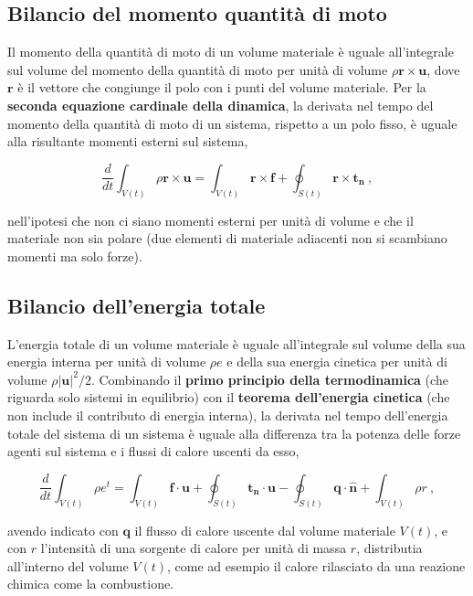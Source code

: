 \subsection{Bilancio del momento quantità di moto}

Il momento della quantità di moto di un volume materiale è uguale all'integrale sul volume del momento della quantità di moto per unità di volume $\rho \bm{r} \times \bm{u}$, dove $\bm{r}$ è il vettore che congiunge il polo con i punti del volume materiale.
Per la \textbf{seconda equazione cardinale della dinamica}, la derivata nel tempo del momento della quantità di moto di un sistema, rispetto a un polo fisso, è uguale alla risultante momenti esterni sul sistema,
\begin{fBox}
\begin{equation}
 \dfrac{d}{dt} \int_{V(t)} \rho \bm{r} \times \bm{u} = \int_{V(t)} \bm{r} \times \bm{f} + \oint_{S(t)} \bm{r} \times \bm{t_n} \ , 
\end{equation}
\end{fBox}
nell'ipotesi che non ci siano momenti esterni per unità di volume e che il materiale non sia polare (due elementi di materiale adiacenti non si scambiano momenti ma solo forze).

\subsection{Bilancio dell'energia totale}

L'energia totale di un volume materiale è uguale all'integrale sul volume della sua energia interna per unità di volume $\rho e$ e della sua energia cinetica per unità di volume $\rho |\bm{u}|^2/2$. Combinando il \textbf{primo principio della termodinamica} (che riguarda solo sistemi in equilibrio) con il \textbf{teorema dell'energia cinetica} (che non include il contributo di energia interna), la derivata nel tempo dell'energia totale del sistema di un sistema è uguale alla differenza tra la potenza delle forze agenti sul sistema e i flussi di calore uscenti da esso,
\begin{fBox}
\begin{equation}
 \dfrac{d}{dt} \int_{V(t)} \rho e^t = \int_{V(t)} \bm{f} \cdot \bm{u} + \oint_{S(t)} \bm{t_n} \cdot \bm{u} - \oint_{S(t)} \bm{q} \cdot \bm{\hat{n}} + \int_{V(t)} \rho r \ , 
\end{equation}
\end{fBox}
avendo indicato con $\bm{q}$ il flusso di calore uscente dal volume materiale $V(t)$, e con $r$ l'intensità di una sorgente di calore per unità di massa $r$, distributia all'interno del volume $V(t)$, come ad esempio il calore rilasciato da una reazione chimica come la combustione.

